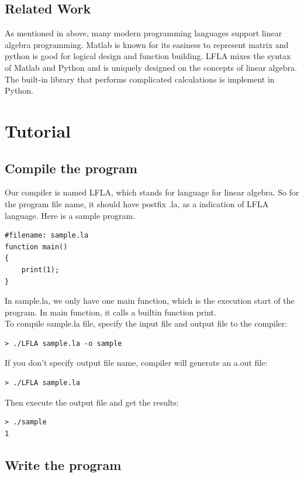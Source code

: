 \documentclass[12pt]{article} %
\begin{document}
\subsection{Related Work}
\noindent As mentioned in above, many modern programming languages support linear algebra programming. Matlab is known for its easiness to represent matrix and python is good for logical design and function building. LFLA mixes the syntax of Matlab and Python and is uniquely designed on the concepts of linear algebra. The built-in library that performs complicated calculations is implement in Python.






\section{Tutorial}
\subsection{Compile the program}
\noindent Our compiler is named LFLA, which stands for language for linear algebra. So for the program file name, it should have postfix .la, as a indication of LFLA language. Here is a sample program.
 \begin{lstlisting} 
#filename: sample.la
function main()
{
	print(1);
}
 \end{lstlisting}
In sample.la, we only have one main function, which is the execution start of the program. In main function, it calls a builtin function print.\\
To compile sample.la file, specify the input file and output file to the compiler:
\begin{lstlisting} 
> ./LFLA sample.la -o sample
\end{lstlisting}
If you don't specify output file name, compiler will generate an a.out file:
\begin{lstlisting} 
> ./LFLA sample.la 
\end{lstlisting}
Then execute the output file and get the results:
\begin{lstlisting} 
> ./sample
1
\end{lstlisting}
\subsection{Write the program}
\end{document}
